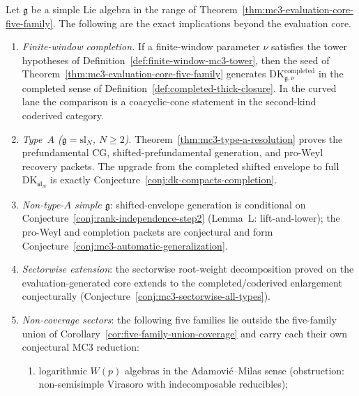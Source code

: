 \begin{theorem}
\label{thm:mc3-dk-compact-completion-boundary}
%
%
Let $\mathfrak{g}$ be a simple Lie algebra in the range of
Theorem~\ref{thm:mc3-evaluation-core-five-family}. The following are
the exact implications beyond the evaluation core.
\begin{enumerate}[label=\textup{(\roman*)},nosep]
\item \emph{Finite-window completion.} If a finite-window parameter
 $\nu$ satisfies the tower hypotheses of
 Definition~\ref{def:finite-window-mc3-tower}, then the seed of
 Theorem~\ref{thm:mc3-evaluation-core-five-family} generates
 $\mathrm{DK}^{\mathrm{completed}}_{\mathfrak g,\nu}$ in the completed
 sense of Definition~\ref{def:completed-thick-closure}. In the curved
 lane the comparison is a coacyclic-cone statement in the second-kind
 coderived category.
\item \emph{Type~$A$ \textup{(}$\mathfrak{g} = \mathrm{sl}_N$,
 $N \ge 2$\textup{)}}. Theorem~\ref{thm:mc3-type-a-resolution}
 proves the prefundamental CG, shifted-prefundamental generation, and
 pro-Weyl recovery packets. The upgrade from the completed shifted
 envelope to full $\mathrm{DK}_{\mathfrak{sl}_N}$ is exactly
 Conjecture~\ref{conj:dk-compacts-completion}.
\item \emph{Non-type-$A$ simple $\mathfrak{g}$}: shifted-envelope
 generation is conditional on
 Conjecture~\ref{conj:rank-independence-step2} \textup{(}Lemma~L:
 lift-and-lower\textup{)};
 the pro-Weyl and completion packets are conjectural and form
 Conjecture~\ref{conj:mc3-automatic-generalization}.
\item \emph{Sectorwise extension}: the sectorwise root-weight
 decomposition proved on the evaluation-generated core extends to
 the completed/coderived enlargement conjecturally
 \textup{(}Conjecture~\ref{conj:mc3-sectorwise-all-types}\textup{)}.
\item \emph{Non-coverage sectors}: the following five
 families lie outside the five-family union of
 Corollary~\ref{cor:five-family-union-coverage} and carry each
 their own conjectural MC3 reduction:
\begin{enumerate}[label=\textup{(v.\alph*)},nosep]
\item logarithmic $W(p)$ algebras in the Adamovi\'c--Milas sense
 \textup{(}obstruction: non-semisimple Virasoro with
 indecomposable reducibles\textup{)};

\end{enumerate}
\end{enumerate}
\end{theorem}
